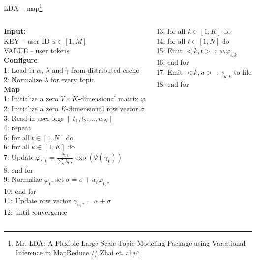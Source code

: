 \documentclass[aspectratio=1610]{beamer}
\begin{document}
\begin{frame}[fragile]{LDA -- map\footnote{Mr. LDA: A Flexible Large Scale Topic Modeling Package
using Variational Inference in MapReduce // Zhai et. al.}}

\begin{columns}[C]
    \begin{column}{.5\textwidth}    
\begin{small}

{\bf Input:} \\
KEY -- user ID $u \in [1, M]$ \\
VALUE -- user tokens \\
{\bf Configure} \\
1: Load in $\alpha$, $\lambda$ and $\gamma$ from distributed cache  \\
2: Normalize $\lambda$ for every topic \\
{\bf Map} \\
1: Initialize a zero $V \times K$-dimensional matrix $\varphi$ \\
2: Initialize a zero $K$-dimensional row vector $\sigma$ \\
3: Read in user logs $\| t_1, t_2, . . . , w_N \|$ \\
4: repeat \\
5: \;\;for all $t \in [1, N]$ do \\
6: \;\;\;\;for all $k \in [1, K]$ do \\
7: \;\;\;\;\;\;Update $\varphi_{t,k} = \frac{\lambda_{t,k}}{\sum_t \lambda_{t,k}} \exp \left( \Psi(\gamma_k) \right)$ \\
8: \;\;\;\;end for \\
9: \;\;\;\;Normalize $\varphi_t$, set $\sigma = \sigma + w_t \varphi_{t,*}$ \\
10: \;end for \\
11: \;Update row vector $\gamma_{u,*} = \alpha + \sigma$ \\
12: until convergence 

\end{small}    
    \end{column}
    \begin{column}{.4\textwidth} 
\begin{small}

13: for all $k \in [1, K]$ do \\
14: \;\;for all $t \in [1, N]$ do \\
15: \;\;\;\;Emit $<k, t>$ : $w_t \varphi_{t,k}$ \\
16: \;\;end for \\
17: Emit $<k, u>$ : $\gamma_{u,k}$ to file \\
18: end for 

\end{small}
    \end{column}
\end{columns}

\end{frame}
\end{document}
